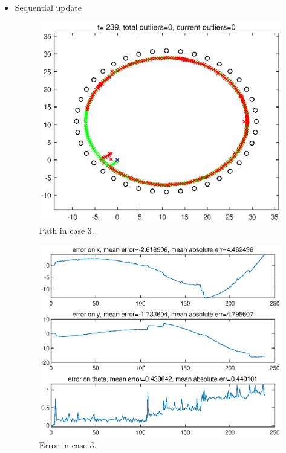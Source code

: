 \documentclass[11pt,a4paper]{article}
\begin{document}
\begin{itemize}
	\item Sequential update
		\vspace{2cm}
		\begin{figure}[H]
			\centering
			\includegraphics[width=\columnwidth]{Figure/Case_3_Figure_1.eps}
			\caption{Path in case 3.}
			\label{fig:Case_3_Figure_1}
		\end{figure}

		\begin{figure}[H]
			\centering
			\includegraphics[width=0.9\columnwidth]{Figure/Case_3_Figure_2.eps}
			\caption{Error in case 3.}
			\label{fig:Case_3_Figure_2}
		\end{figure}


\end{itemize}
\end{document}
